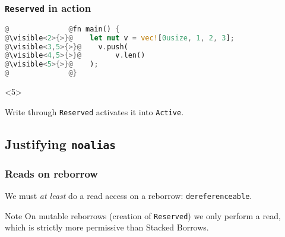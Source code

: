 \begin{frame}[fragile, t]
    \frametitle{\texttt{Reserved} in action}
    \begin{block}{}
        \begin{lstlisting}[language=rust, escapechar=\@]
@              @fn main() {
@\visible<2>{>}@    let mut v = vec![0usize, 1, 2, 3];
@\visible<3,5>{>}@    v.push(
@\visible<4,5>{>}@        v.len()
@\visible<5>{>}@    );
@              @}
        \end{lstlisting}
    \end{block}
    \begin{block}{}
    \end{block}
    \begin{onlyenv}<5>
        \begin{block}{}
            Write through \texttt{Reserved} activates it into \texttt{Active}.
        \end{block}
    \end{onlyenv}
\end{frame}

\subsection{Justifying \texttt{noalias}}

\begin{frame}
    \frametitle{Reads on reborrow}
    We must \textit{at least} do a read access on a reborrow: \texttt{dereferenceable}.\\

    \begin{block}{Note}
        On mutable reborrows (creation of \texttt{Reserved}) we only perform a read,
        which is strictly more permissive than Stacked Borrows.
    \end{block}
\end{frame}

